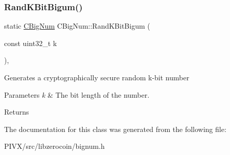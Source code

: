 \subsubsection{\texorpdfstring{Rand\+K\+Bit\+Bigum()}{RandKBitBigum()}}
{\footnotesize\ttfamily static \mbox{\hyperlink{class_c_big_num}{C\+Big\+Num}} C\+Big\+Num\+::\+Rand\+K\+Bit\+Bigum (\begin{DoxyParamCaption}\item[{const uint32\+\_\+t}]{k }\end{DoxyParamCaption})\hspace{0.3cm}{\ttfamily [inline]}, {\ttfamily [static]}}

Generates a cryptographically secure random k-\/bit number 
\begin{DoxyParams}{Parameters}
{\em k} & The bit length of the number. \\
\hline
\end{DoxyParams}
\begin{DoxyReturn}{Returns}

\end{DoxyReturn}


The documentation for this class was generated from the following file\+:\begin{DoxyCompactItemize}
\item 
P\+I\+V\+X/src/libzerocoin/bignum.\+h\end{DoxyCompactItemize}
